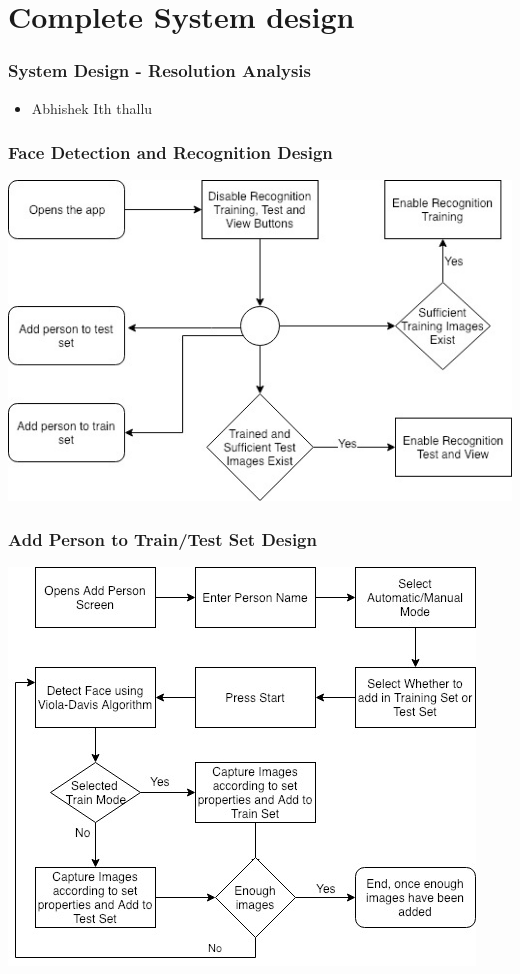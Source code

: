 \documentclass[10pt]{beamer}
\begin{document}
\section{Complete System design}
\begin{frame}
\frametitle{System Design - Resolution Analysis}
\begin{itemize}
    \item{Abhishek Ith thallu}
\end{itemize}
\end{frame}
\begin{frame}
\frametitle{Face Detection and Recognition Design}
\includegraphics[scale=.5]{MainActivity.jpg}\medskip\\

\end{frame}
\begin{frame}
\frametitle{Add Person to Train/Test Set Design}
\includegraphics[scale=.6]{AddImages.jpg}\medskip\\

\end{frame}
\end{document}
